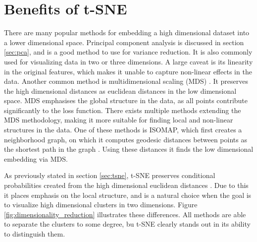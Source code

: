 \documentclass[a4paper, 10pt]{memoir}
\theoremstyle{plain}
\theoremstyle{definition}
\theoremstyle{remark}
\begin{document}
\section{Benefits of t-SNE}
There are many popular methods for embedding a high dimensional dataset into a lower dimensional space.
Principal component analysis is discussed in section \ref{sec:pca}, and is a good method to use for variance reduction.
It is also commonly used for visualizing data in two or three dimensions.
A large caveat is its linearity in the original features, which makes it unable to capture non-linear effects in the data.
Another common method is multidimensional scaling (MDS) \cite{hastie}.
It preserves the high dimensional distances as euclidean distances in the low dimensional space.
MDS emphasises the global structure in the data, as all points contribute significantly to the loss function.
There exists multiple methods extending the MDS methodology, making it more suitable for finding local and non-linear structures in the data. 
One of these methods is ISOMAP, which first creates a neighborhood graph, on which it computes geodesic distances between points as the shortest path in the graph \cite{tenenbaum}.
Using these distances it finds the low dimensional embedding via MDS.

As previously stated in section \ref{sec:tsne}, t-SNE preserves conditional probabilities created from the high dimensional euclidean distances \cite{hinton}.
Due to this it places emphasis on the local structure, and is a natural choice when the goal is to visualize high dimensional clusters in two dimensions.
Figure \ref{fig:dimensionality_reduction} illustrates these differences.
All methods are able to separate the clusters to some degree, bu t-SNE clearly stands out in its ability to distinguish them.
\end{document}

